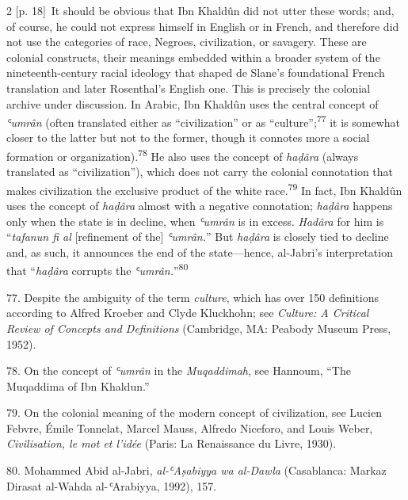 \documentclass[10pt,a4paper]{article}
\begin{document}
\begin{paracol}{2}
\switchcolumn
{\scriptsize\color{gray} [p. 18]}\ It should be obvious that Ibn Khaldûn did not utter these words; and, of course, he could not express himself in English or in French, and therefore did not use the categories of race, Negroes, civilization, or savagery. These are colonial constructs, their meanings embedded within a broader system of the nineteenth-century racial ideology that shaped de Slane’s foundational French translation and later Rosenthal’s English one. This is precisely the colonial archive under discussion. In Arabic, Ibn Khaldûn uses the central concept of \textit{ʿumrân} (often translated either as “civilization” or as “culture”;\nobreak\textsuperscript{77} it is somewhat closer to the latter but not to the former, though it connotes more a social formation or organization).\nobreak\textsuperscript{78} He also uses the concept of \textit{haḍâra} (always translated as “civilization”), which does not carry the colonial connotation that makes civilization the exclusive product of the white race.\nobreak\textsuperscript{79} In fact, Ibn Khaldûn uses the concept of \textit{haḍâra} almost with a negative connotation; \textit{haḍâra} happens only when the state is in decline, when \textit{ʿumrân} is in excess. \textit{Hadâra} for him is “\textit{tafanun fi al} [refinement of the] \textit{ʿumrân.}” But \textit{haḍâra} is closely tied to decline and, as such, it announces the end of the state—hence, al-Jabri’s interpretation that “\textit{haḍâra} corrupts the \textit{ʿumrân.}”\nobreak\textsuperscript{80}\par{\small 77. Despite the ambiguity of the term \textit{culture}, which has over 150 definitions according to Alfred Kroeber and Clyde Kluckhohn; see \textit{Culture: A Critical Review of Concepts and Definitions} (Cambridge, MA: Peabody Museum Press, 1952).\par}{\small 78. On the concept of \textit{ʿumrân} in the \textit{Muqaddimah}, see Hannoum, “The Muqaddima of Ibn Khaldun.”\par}{\small 79. On the colonial meaning of the modern concept of civilization, see Lucien Febvre, Émile Tonnelat, Marcel Mauss, Alfredo Niceforo, and Louis Weber, \textit{Civilisation, le mot et l’idée} (Paris: La Renaissance du Livre, 1930).\par}{\small 80. Mohammed Abid al-Jabri, \textit{al-ʿAṣabiyya wa al-Dawla} (Casablanca: Markaz Dirasat al-Wahda al-\textit{ʿ}Arabiyya, 1992), 157.\par}
\switchcolumn*

\end{paracol}
\end{document}
